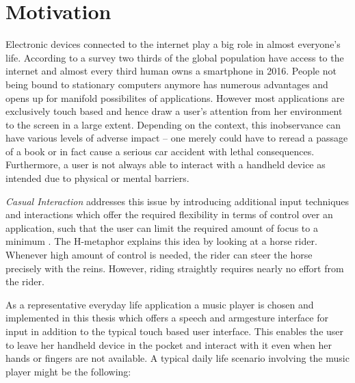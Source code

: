 \chapter{Motivation}\label{ch:motivation}

Electronic devices connected to the internet play a big role in almost everyone's life. According to a survey\cite{smartphoneSurvey} two thirds of the global population have access to the internet and almost every third human owns a smartphone in 2016. People not being bound to stationary computers anymore has numerous advantages and opens up for manifold possibilites of applications. However most applications are exclusively touch based and hence draw a user's attention from her environment to the screen in a large extent. Depending on the context, this inobservance can have various levels of adverse impact -- one merely could have to reread a passage of a book or in fact cause a serious car accident with lethal consequences. Furthermore, a user is not always able to interact with a handheld device as intended due to physical or mental barriers.
 
\textit{Casual Interaction} addresses this issue by introducing additional input techniques and interactions which offer the required flexibility in terms of control over an application, such that the user can limit the required amount of focus to a minimum \cite{pohl2013focused}. The H-metaphor \cite{flemisch2003h} explains this idea by looking at a horse rider. Whenever high amount of control is needed, the rider can steer the horse precisely with the reins. However, riding straightly requires nearly no effort from the rider. 

As a representative everyday life application a music player is chosen and implemented in this thesis which offers a speech and armgesture interface for input in addition to the typical touch based user interface. This enables the user to leave her handheld device in the pocket and interact with it even when her hands or fingers are not available. A typical daily life scenario involving the music player might be the following:\\


